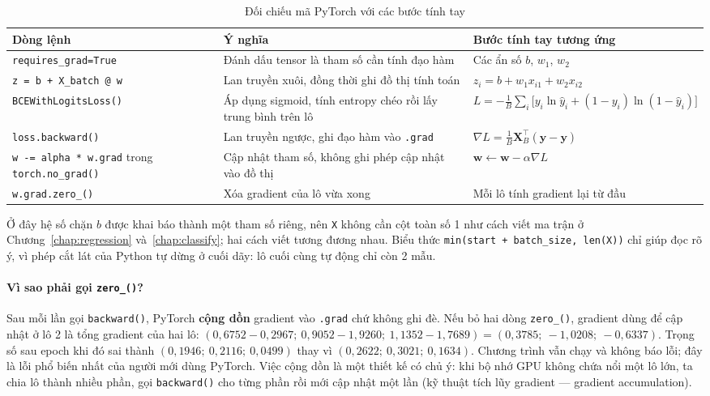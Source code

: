 \begin{table}[H]
\centering
\small
\begin{tabular}{|p{4.5cm}|p{4.3cm}|p{4.6cm}|}
\hline
\textbf{Dòng lệnh} & \textbf{Ý nghĩa} & \textbf{Bước tính tay tương ứng} \\
\hline
\texttt{requires\_grad=True} & Đánh dấu tensor là tham số cần tính đạo hàm & Các ẩn số $b$, $w_1$, $w_2$ \\ \hline
\texttt{z = b + X\_batch @ w} & Lan truyền xuôi, đồng thời ghi đồ thị tính toán & $z_i = b + w_1x_{i1} + w_2x_{i2}$ \\ \hline
\texttt{BCEWithLogitsLoss()} & Áp dụng sigmoid, tính entropy chéo rồi lấy trung bình trên lô & $L = -\frac{1}{B}\sum_i \big[y_i\ln\hat{y}_i + (1 - y_i)\ln(1 - \hat{y}_i)\big]$ \\ \hline
\texttt{loss.backward()} & Lan truyền ngược, ghi đạo hàm vào \texttt{.grad} & $\nabla L = \frac{1}{B}\mathbf{X}_B^\top(\hat{\mathbf{y}} - \mathbf{y})$ \\ \hline
\texttt{w -= alpha * w.grad} trong \texttt{torch.no\_grad()} & Cập nhật tham số, không ghi phép cập nhật vào đồ thị & $\mathbf{w} \leftarrow \mathbf{w} - \alpha\nabla L$ \\ \hline
\texttt{w.grad.zero\_()} & Xóa gradient của lô vừa xong & Mỗi lô tính gradient lại từ đầu \\ \hline
\end{tabular}
\caption{Đối chiếu mã PyTorch với các bước tính tay}
\label{tab:torch-lines}
\end{table}

Ở đây hệ số chặn $b$ được khai báo thành một tham số riêng, nên \texttt{X} không cần cột toàn số 1 như cách viết ma trận ở Chương~\ref{chap:regression} và~\ref{chap:classify}; hai cách viết tương đương nhau. Biểu thức \texttt{min(start + batch\_size, len(X))} chỉ giúp đọc rõ ý, vì phép cắt lát của Python tự dừng ở cuối dãy: lô cuối cùng tự động chỉ còn 2 mẫu.

\paragraph{Vì sao phải gọi \texttt{zero\_()}?} Sau mỗi lần gọi \texttt{backward()}, PyTorch \textbf{cộng dồn} gradient vào \texttt{.grad} chứ không ghi đè. Nếu bỏ hai dòng \texttt{zero\_()}, gradient dùng để cập nhật ở lô 2 là tổng gradient của hai lô: $(0{,}6752 - 0{,}2967;\ 0{,}9052 - 1{,}9260;\ 1{,}1352 - 1{,}7689) = (0{,}3785;\ -1{,}0208;\ -0{,}6337)$. Trọng số sau epoch khi đó sai thành $(0{,}1946;\ 0{,}2116;\ 0{,}0499)$ thay vì $(0{,}2622;\ 0{,}3021;\ 0{,}1634)$. Chương trình vẫn chạy và không báo lỗi; đây là lỗi phổ biến nhất của người mới dùng PyTorch. Việc cộng dồn là một thiết kế có chủ ý: khi bộ nhớ GPU không chứa nổi một lô lớn, ta chia lô thành nhiều phần, gọi \texttt{backward()} cho từng phần rồi mới cập nhật một lần (kỹ thuật tích lũy gradient --- gradient accumulation).


